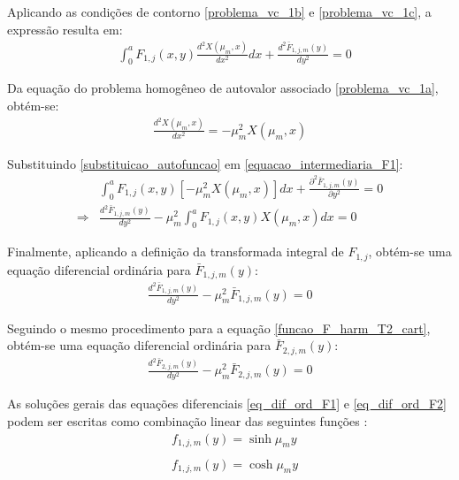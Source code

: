 Aplicando as condições de contorno \eqref{problema_vc_1b} e \eqref{problema_vc_1c}, a expressão resulta em: 
\begin{align}
	&
	\int_0^a  F_{1,j}(x, y)\frac{d^2X(\mu_m, x)}{dx^2} dx + \frac{d^2 \bar{F}_{1,j,m}(y)}{d y^2} = 0 \label{equacao_intermediaria_F1}
\end{align}

Da equação do problema homogêneo de autovalor associado \eqref{problema_vc_1a}, obtém-se:
\begin{align}
	\frac{d^2 X(\mu_m, x)}{d x^2} = -\mu_m^2 X(\mu_m, x) \label{substituicao_autofuncao}
\end{align}

Substituindo \eqref{substituicao_autofuncao} em \eqref{equacao_intermediaria_F1}:
\begin{align}
	&
	\int_0^a  F_{1,j}(x, y)[-\mu_m^2 X(\mu_m, x)] dx + \frac{\partial^2 \bar{F}_{1,j,m}(y)}{\partial y^2} = 0 \nonumber \\
	\Rightarrow &
	\frac{d^2 \bar{F}_{1,j,m}(y)}{d y^2}
	-
	\mu_m^2 \int_0^a  F_{1,j}(x, y)X(\mu_m, x) dx = 0
\end{align}

Finalmente, aplicando a definição da transformada integral de $F_{1, j}$, obtém-se uma equação diferencial ordinária para $\bar{F}_{1,j,m}(y)$:
\begin{align}
	\frac{d^2 \bar{F}_{1,j,m}(y)}{d y^2}
	-
	\mu_m^2 \bar{F}_{1,j,m}(y) = 0 \label{eq_dif_ord_F1}
\end{align}

Seguindo o mesmo procedimento para a equação \eqref{funcao_F_harm_T2_cart}, obtém-se uma equação diferencial ordinária para $\bar{F}_{2,j,m}(y)$:
\begin{align}
	\frac{d^2 \bar{F}_{2,j,m}(y)}{d y^2}
	-
	\mu_m^2 \bar{F}_{2,j,m}(y) = 0 \label{eq_dif_ord_F2}
\end{align}

As soluções gerais das equações diferenciais \eqref{eq_dif_ord_F1} e \eqref{eq_dif_ord_F2} podem ser escritas como combinação linear das seguintes funções \citep{livro_boyce}:
\begin{align}
& f_{1,j,m}(y) = \sinh\mu_m y \label{basic_1}\\ \nonumber \\
& f_{1,j,m}(y) = \cosh\mu_m y \label{basic_2}
\end{align}


